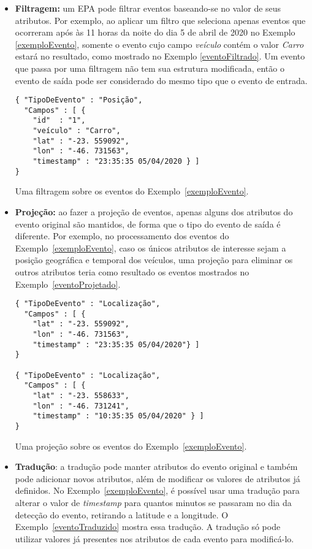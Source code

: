 \begin{itemize}
\item \textbf{Filtragem:} um EPA pode filtrar eventos baseando-se no valor de seus atributos. 
Por exemplo, ao aplicar um filtro que seleciona apenas eventos que ocorreram após às 11 horas da noite do dia 5 de abril de 2020 no Exemplo \ref{exemploEvento}, somente o evento cujo campo \textit{veículo} contém o valor \textit{Carro} estará no resultado, como mostrado no Exemplo \ref{eventoFiltrado}. Um evento que passa por uma filtragem não tem sua estrutura modificada, então o evento de saída pode ser considerado do mesmo tipo que o evento de entrada. 
\begin{evento}[h]
\begin{verbatim}
{ "TipoDeEvento" : "Posição",
  "Campos" : [ {
    "id"  : "1",
    "veículo" : "Carro",
    "lat" : "-23. 559092",
    "lon" : "-46. 731563",
    "timestamp" : "23:35:35 05/04/2020 } ]
}
\end{verbatim}
\caption{Uma filtragem sobre os eventos do Exemplo~\ref{exemploEvento}.}
\label{eventoFiltrado}
\end{evento}


\item \textbf{Projeção:} ao fazer a projeção de eventos, apenas alguns dos atributos do evento original são mantidos, de forma que o tipo do evento de saída é diferente. Por exemplo, no processamento dos eventos do Exemplo~\ref{exemploEvento}, caso os únicos atributos de interesse sejam a posição geográfica e temporal dos veículos, uma projeção para eliminar os outros atributos teria como resultado os eventos mostrados no Exemplo~\ref{eventoProjetado}. 
\begin{evento}[h]
\begin{verbatim}
{ "TipoDeEvento" : "Localização",
  "Campos" : [ {
    "lat" : "-23. 559092",
    "lon" : "-46. 731563",
    "timestamp" : "23:35:35 05/04/2020"} ]
}

{ "TipoDeEvento" : "Localização",
  "Campos" : [ {
    "lat" : "-23. 558633",
    "lon" : "-46. 731241",
    "timestamp" : "10:35:35 05/04/2020" } ]
}
\end{verbatim}
\caption{Uma projeção sobre os eventos do Exemplo~\ref{exemploEvento}.}
\label{eventoProjetado}
\end{evento}


\item \textbf{Tradução}: a tradução pode manter atributos do evento original e também pode adicionar novos atributos, além de modificar os valores de atributos já definidos. No Exemplo~\ref{exemploEvento}, é possível usar uma tradução para alterar o valor de \textit{timestamp} para quantos minutos se passaram no dia da detecção do evento, retirando a latitude e a longitude.
O Exemplo~\ref{eventoTraduzido} mostra essa tradução. A tradução só pode utilizar valores já presentes nos atributos de cada evento para modificá-lo.


\end{itemize}
